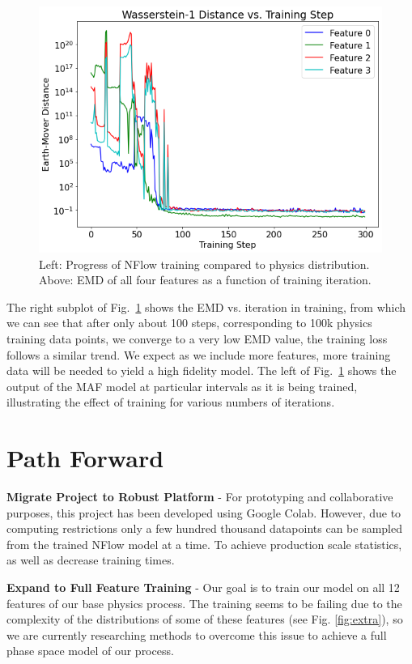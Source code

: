 \begin{figure}[!ht]
\begin{minipage}{0.4\textwidth}
        \centering
        \includegraphics[width=.98\textwidth,trim={0 0 0 0},clip]{pictures/milestoneR2/w1.png}
        \caption{Left: Progress of NFlow training compared to physics distribution. Above: EMD of all four features as a function of training iteration.}
        \label{fig:c}
    \end{minipage}
\end{figure}

The right subplot of Fig.~\ref{fig:c} shows the EMD vs. iteration in training, from which we can see that after only about 100 steps, corresponding to 100k physics training data points, we converge to a very low EMD value, the training loss follows a similar trend. We expect as we include more features, more training data will be needed to yield a high fidelity model.  The left of Fig.~\ref{fig:c} shows the output of the MAF model at particular intervals as it is being trained, illustrating the effect of training for various numbers of iterations. 

\section{Path Forward}
\textbf{Migrate Project to Robust Platform} - For prototyping and collaborative purposes, this project has been developed using Google Colab. However, due to computing restrictions only a few hundred thousand datapoints can be sampled from the trained NFlow model at a time. To achieve production scale statistics, as well as decrease training times. 

\textbf{Expand to Full Feature Training} - Our goal is to train our model on all 12 features of our base physics process. The training seems to be failing due to the complexity of the distributions of some of these features (see Fig. \ref{fig:extra}), so we are currently researching methods to overcome this issue to achieve a full phase space model of our process.


